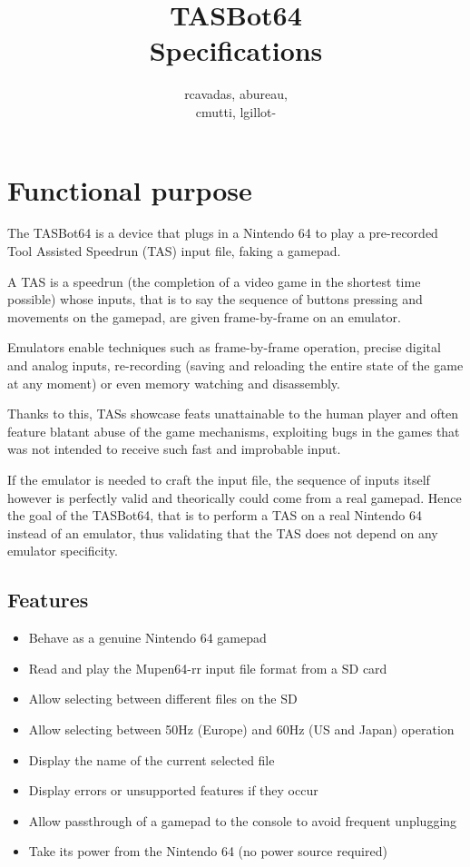 \documentclass[a4paper,oneside,12pt]{article}
\title{TASBot64\\Specifications}
\author{rcavadas, abureau,\\cmutti, lgillot-}
\begin{document}
\maketitle

\section{Functional purpose}
The TASBot64 is a device that plugs in a Nintendo 64 to play a pre-recorded Tool
Assisted Speedrun (TAS) input file, faking a gamepad.

A TAS is a speedrun (the completion of a video game in the shortest time
possible) whose inputs, that is to say the sequence of buttons pressing and
movements on the gamepad, are given frame-by-frame on an emulator.

Emulators enable techniques such as frame-by-frame operation, precise digital
and analog inputs, re-recording (saving and reloading the entire state of the
game at any moment) or even memory watching and disassembly.

Thanks to this, TASs showcase feats unattainable to the human player and often
feature blatant abuse of the game mechanisms, exploiting bugs in the games that
was not intended to receive such fast and improbable input.

If the emulator is needed to craft the input file, the sequence of inputs itself
however is perfectly valid and theorically could come from a real gamepad. Hence
the goal of the TASBot64, that is to perform a TAS on a real Nintendo 64 instead
of an emulator, thus validating that the TAS does not depend on any emulator
specificity.

\subsection{Features}
\begin{itemize}
\item Behave as a genuine Nintendo 64 gamepad
\item Read and play the Mupen64-rr input file format from a SD card
\item Allow selecting between different files on the SD
\item Allow selecting between 50Hz (Europe) and 60Hz (US and Japan) operation
\item Display the name of the current selected file
\item Display errors or unsupported features if they occur
\item Allow passthrough of a gamepad to the console to avoid frequent unplugging
\item Take its power from the Nintendo 64 (no power source required)
\end{itemize}
\end{document}
